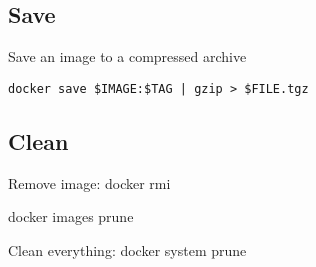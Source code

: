 \subsection*{Save}


Save an image to a compressed archive

\texttt{docker save \$IMAGE:\$TAG | gzip > \$FILE.tgz }

\subsection*{Clean}

Remove image: docker rmi

docker images prune

Clean everything: docker system prune




%
%



